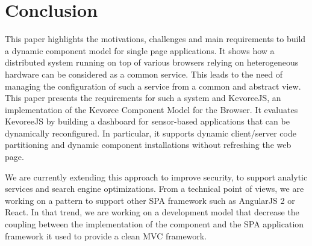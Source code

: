 \section{Conclusion}
This paper highlights the motivations, challenges and main requirements to build a dynamic component model for single page applications. It shows how a distributed system running on top of various browsers relying on heterogeneous hardware can be considered as a common service. This leads to the need of managing the configuration of such a service from a common and abstract view. This paper presents the requirements for such a system and KevoreeJS, an implementation of the Kevoree Component Model for the Browser. It evaluates KevoreeJS by building a dashboard for sensor-based applications that can be dynamically reconfigured. In particular, it supports dynamic client/server code partitioning and dynamic component installations without refreshing the web page.

We are currently extending this approach to improve security, to support analytic services and search engine optimizations. From a technical point of views, we are working on a pattern to support other SPA framework such as AngularJS 2 or React. In that trend, we are working on a development model that decrease the coupling between the implementation of the component and the SPA application framework it used to provide a clean MVC framework.  %

